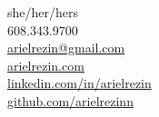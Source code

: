 \documentclass[]{hieudo-build}
\begin{document}
%
%
{
	\hspace{1pt} \faTransgender \hspace{3pt} {she/her/hers}\\
	\faPhone \hspace{3pt} {608.343.9700}\\
	\faEnvelope \hspace{3pt} \href{mailto:arielrezin@gmail.com}{arielrezin@gmail.com}\\
}
{
	\faGlobe \hspace{2.25pt} \href{https://arielrezin.com}{arielrezin.com}\\
	\faLinkedin \hspace{3pt} \href{https://linkedin.com/in/arielrezin}{linkedin.com/in/arielrezin}\\
	\faGithub \hspace{2pt} \href{https://github.com/arielrezinn}{github.com/arielrezinn}\\
}
    
\end{document}
